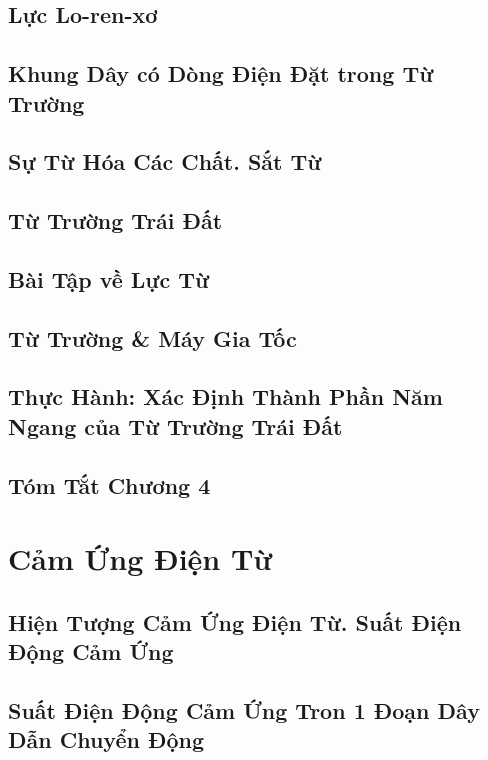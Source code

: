 \documentclass[oneside]{book}
\numberwithin{equation}{section}
\begin{document}
\section{Lực Lo-ren-xơ}

\section{Khung Dây có Dòng Điện Đặt trong Từ Trường}

\section{Sự Từ Hóa Các Chất. Sắt Từ}

\section{Từ Trường Trái Đất}

\section{Bài Tập về Lực Từ}

\section{Từ Trường \& Máy Gia Tốc}

\section{Thực Hành: Xác Định Thành Phần Năm Ngang của Từ Trường Trái Đất}

\section{Tóm Tắt Chương 4}


\chapter{Cảm Ứng Điện Từ}

\section{Hiện Tượng Cảm Ứng Điện Từ. Suất Điện Động Cảm Ứng}

\section{Suất Điện Động Cảm Ứng Tron 1 Đoạn Dây Dẫn Chuyển Động}
\end{document}
